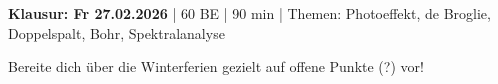 \documentclass[11pt,a4paper]{article}
\begin{document}
\vspace{0.4em}
\begin{hinweisbox}
\textbf{Klausur: Fr 27.02.2026} | 60 BE | 90 min | Themen: Photoeffekt, de Broglie, Doppelspalt, Bohr, Spektralanalyse

\vspace{0.2em}
Bereite dich \"uber die Winterferien gezielt auf offene Punkte (?) vor!
\end{hinweisbox}
\end{document}
